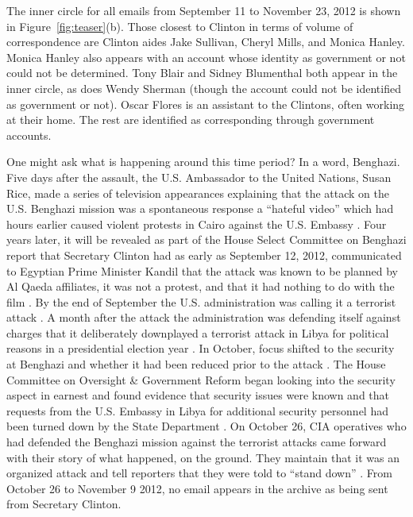 \documentclass[journal]{vgtc}                %
\begin{document}
The inner circle for all emails from September 11 to November 23, 2012 is shown in Figure~\ref{fig:teaser}(b).  Those closest to Clinton in terms of volume of correspondence are Clinton aides Jake Sullivan, Cheryl Mills, and Monica Hanley.  Monica Hanley also appears with an account whose identity as government or not could not be determined.  Tony Blair and Sidney Blumenthal both appear in the inner circle, as does Wendy Sherman (though the account could not be identified as government or not).  Oscar Flores is an assistant to the Clintons, often working at their home.  The rest are identified as corresponding through government accounts.

One might ask what is happening around this time period?  In a word, Benghazi.  Five days after the assault, the U.S. Ambassador to the United Nations, Susan Rice, made a series of television appearances explaining that the attack on the U.S. Benghazi mission was a spontaneous response a  ``hateful video''  which had hours earlier caused violent protests in Cairo against the U.S. Embassy \cite{faceTheNationSept16}.   Four years later, it will be revealed as part of the House Select Committee on Benghazi report \cite{BenghaziReport} that Secretary Clinton had as early as September 12, 2012, communicated to Egyptian Prime Minister Kandil that the attack was known to be planned by Al Qaeda affiliates, it was not a protest, and that it had nothing to do with the film \cite{ClintonAdmitsAttackSept12}.  By the end of September the U.S. administration was calling it a terrorist attack \cite{factCheckerBenghazi}.  A month after the attack the administration was defending itself against charges that it deliberately downplayed a terrorist attack in Libya for political reasons in a presidential election year \cite{susanRiceWashPost2012}.   In October, focus shifted to the security at Benghazi and whether it had been reduced prior to the attack  \cite{cbsSecurity}.  The House Committee on Oversight \& Government Reform began looking into the security aspect \cite{cbsNewsHouseOversight2012} in earnest and found evidence that security issues were known and that requests from the U.S. Embassy in Libya for additional security personnel had been turned down by the State Department \cite{BenghaziSecurityTestimony}.  On October 26, CIA operatives who had defended the Benghazi mission against the terrorist attacks came forward with their story of what happened, on the ground.  They maintain that it was an organized attack and tell reporters that they were told to ``stand down'' \cite{standDownOrder}.  From October 26 to November 9 2012, no email appears in the archive as being sent from Secretary Clinton.
\end{document}
